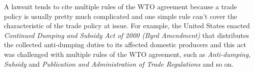 A lawsuit tends to cite multiple rules of the WTO agreement because a trade policy is usually pretty much complicated 
and one simple rule can't cover the characteristic of the trade policy at issue.
For example, the United States enacted \textit{Continued Dumping and Subsidy Act of 2000 (Byrd Amendment)} that distributes 
the collected anti-dumping duties to its affected domestic producers and this act was challenged with multiple rules of the WTO agreement, 
such as \textit{Anti-dumping}, \textit{Subsidy} and \textit{Publication and Administration of Trade Regulations} and so on. 

